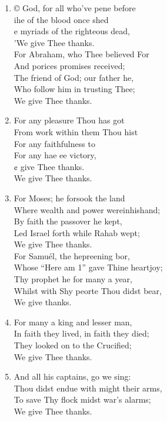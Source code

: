\documentclass[11pt,a4paper]{article}
\begin{document}
\begin{enumerate}
    \item © God, for all who've pene before \\
        ihe of the blood once shed \\
        e myriads of the righteous dead, \\
        'We give Thee thanks. \\
        For Abraham, who Thee believed For \\
        And porices promises received; \\
        The friend of God; our father he, \\
        Who follow him in trusting Thee; \\
        We give Thee thanks.

    \item For any pleasure Thou has got \\
        From work within them Thou hist \\
        For any faithfulness to \\
        For any hae ee victory, \\
        ¢ give Thee thanks. \\
        We give Thee thanks.

    \item For Moses; he forsook the land \\
        Where wealth and power wereinhishand; \\
        By faith the passover he kept, \\
        Led Israel forth while Rahab wept; \\
        We give Thee thanks. \\
        For Samuél, the hepreening bor, \\
        Whose ``Here am 1'' gave Thine heartjoy; \\
        Thy prophet he for many a year, \\
        Whilst with Shy peorte Thou didst bear, \\
        We give thanks.

    \item For many a king and lesser man, \\
        In faith they lived, in faith they died; \\
        They looked on to the Crucified; \\
        We give Thee thanks.

    \item And all his captains, go we sing: \\
        Thou didst endue with might their arms, \\
        To save Thy flock midst war's alarms; \\
        We give Thee thanks.


\end{enumerate}
\end{document}
